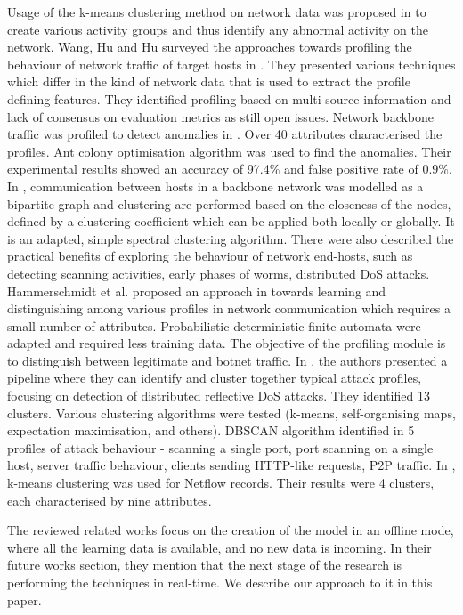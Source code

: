 \documentclass[conference, a4paper]{IEEEtran}
\begin{document}
Usage of the k-means clustering method on network data was proposed in \cite{marchette1999statistical} to create various activity groups and thus identify any abnormal activity on the network.
Wang, Hu and Hu surveyed the approaches towards profiling the behaviour of network traffic of target hosts in \cite{wang2019survey}. They presented various techniques which differ in the kind of network data that is used to extract the profile defining features. They identified profiling based on multi-source information and lack of consensus on evaluation metrics as still open issues.
Network backbone traffic was profiled to detect anomalies in \cite{zang2019adaptive}. Over 40 attributes characterised the profiles. Ant colony optimisation algorithm was used to find the anomalies. Their experimental results showed an accuracy of 97.4\% and false positive rate of 0.9\%.
In \cite{xu2014behavior}, communication between hosts in a backbone network was modelled as a bipartite graph and clustering are performed based on the closeness of the nodes, defined by a clustering coefficient which can be applied both locally or globally. It is an adapted, simple spectral clustering algorithm. There were also described the practical benefits of exploring the behaviour of network end-hosts, such as detecting scanning activities, early phases of worms, distributed DoS attacks.
Hammerschmidt et al. proposed an approach in \cite{hammerschmidt2016efficient} towards learning and distinguishing among various profiles in network communication which requires a small number of attributes. Probabilistic deterministic finite automata were adapted and required less training data. The objective of the profiling module is to distinguish between legitimate and botnet traffic.
In \cite{berti2017profiling}, the authors presented a pipeline where they can identify and cluster together typical attack profiles, focusing on detection of distributed reflective DoS attacks. They identified 13 clusters. Various clustering algorithms were tested (k-means, self-organising maps, expectation maximisation, and others).
DBSCAN algorithm identified in \cite{jakalan2015profiling} 5 profiles of attack behaviour - scanning a single port, port scanning on a single host, server traffic behaviour, clients sending HTTP-like requests, P2P traffic.
In \cite{bakhshi2015user}, k-means clustering was used for Netflow records. Their results were 4 clusters, each characterised by nine attributes. 

The reviewed related works focus on the creation of the model in an offline mode, where all the learning data is available, and no new data is incoming. In their future works section, they mention that the next stage of the research is performing the techniques in real-time. We describe our approach to it in this paper.
\end{document}
